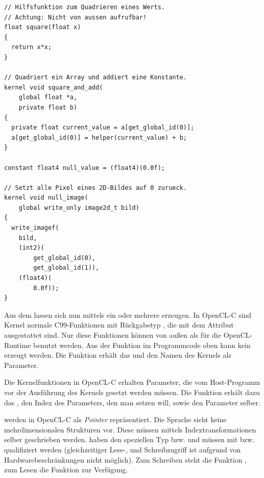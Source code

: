 \begin{verbatim}
// Hilfsfunktion zum Quadrieren eines Werts.
// Achtung: Nicht von aussen aufrufbar!
float square(float x)
{
  return x*x;
}

// Quadriert ein Array und addiert eine Konstante.
kernel void square_and_add(
    global float *a,
    private float b)
{
  private float current_value = a[get_global_id(0)];
  a[get_global_id(0)] = helper(current_value) + b;
}

constant float4 null_value = (float4)(0.0f);

// Setzt alle Pixel eines 2D-Bildes auf 0 zurueck.
kernel void null_image(
    global write_only image2d_t bild)
{
  write_imagef(
    bild,
    (int2)(
        get_global_id(0),
        get_global_id(1)),
    (float4)(
        0.0f));
}
\end{verbatim}

Aus dem  lassen sich nun mittels
 ein oder mehrere
 erzeugen. In OpenCL-C sind Kernel
normale C99-Funktionen mit Rückgabetyp , die
mit dem Attribut  ausgestattet sind. Nur
diese Funktionen können von außen als 
für die OpenCL-Runtime benutzt werden. Aus der Funktion
 im Programmcode oben kann \PimiddyzB kein
 erzeugt werden. Die Funktion
 erhält das  und den
Namen des Kernels als Parameter.

Die Kernelfunktionen in OpenCL-C erhalten Parameter, die vom
Host-Programm vor der Ausführung des Kernels gesetzt werden
müssen. Die Funktion  erhält dazu das
, den Index des Parameters, den man setzen will, sowie den
Parameter selber.

 werden in OpenCL-C als \emph{Pointer} repräsentiert. Die
Sprache sieht keine mehrdimensionalen Strukturen vor. Diese müssen
mittels Indextransformationen selber geschrieben werden. 
haben den speziellen Typ 
bzw.  und müssen mit
 bzw. 
qualifiziert werden (gleichzeitiger Lese-, und Schreibzugriff ist
aufgrund von Hardwarebeschränkungen nicht möglich). Zum Schreiben
steht die Funktion , zum Lesen die
Funktion  zur Verfügung.

